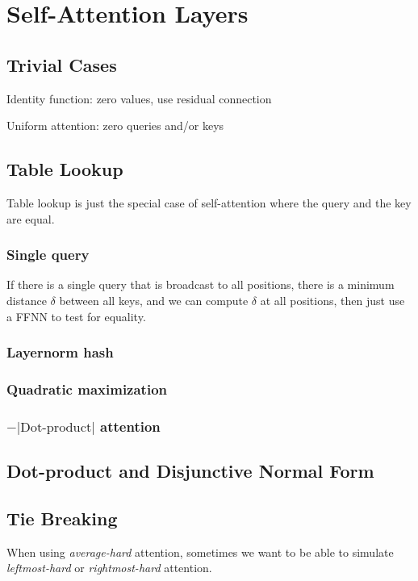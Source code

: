 %
\chapter{Self-Attention Layers}
%

\section{Trivial Cases}

Identity function: zero values, use residual connection

Uniform attention: zero queries and/or keys

\section{Table Lookup}

Table lookup is just the special case of self-attention where the query and the key are equal.

\subsection{Single query}

If there is a single query that is broadcast to all positions, 
there is a minimum distance $\delta$ between all keys, and we can compute $\delta$ at all positions,
then just use a FFNN to test for equality.

\citep{chiang-cholak-2022-parity}

\subsection{Layernorm hash}

\citep{merrill-sabharwal-2024-cot}

\subsection{Quadratic maximization}

\citep{barcelo-etal-2024-logical}

\subsection{$-|\text{Dot-product}|$ attention}

\citep{perez-etal-2021-turing}

\section{Dot-product and Disjunctive Normal Form}
\label{sec:att_dnf}

\section{Tie Breaking}

When using \emph{average-hard} attention, sometimes we want to be able to simulate \emph{leftmost-hard} or \emph{rightmost-hard} attention.
